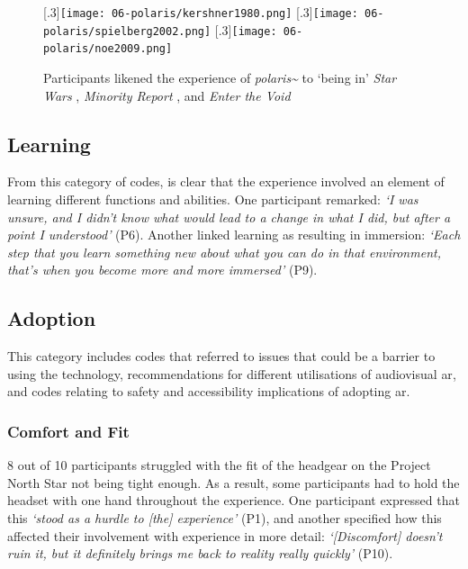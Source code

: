 \begin{figure}
    \centering
    \captionsetup{justification=centering, margin=1.5cm}
    [.3\linewidth]{\texttt{[image: 06-polaris/kershner1980.png]}}
    \hfill
    [.3\linewidth]{\texttt{[image: 06-polaris/spielberg2002.png]}}
    \hfill
    [.3\linewidth]{\texttt{[image: 06-polaris/noe2009.png]}}
    \caption{Participants likened the experience of \textit{polaris\textasciitilde{}} to `being in' \textit{Star Wars} , \textit{Minority Report} , and \textit{Enter the Void} }\label{fig: films}
\end{figure}

\subsection{Learning}\label{sec: polaris-feedback-learning}
From this category of codes, is clear that the experience involved an element of learning different functions and abilities. One participant remarked: \textit{`I was unsure, and I didn't know what would lead to a change in what I did, but after a point I understood'} (P6). Another linked learning as resulting in immersion: \textit{`Each step that you learn something new about what you can do in that environment, that's when you become more and more immersed'} (P9).

\subsection{Adoption}\label{sec: polaris-feedback-adoption}
This category includes codes that referred to issues that could be a barrier to using the technology, recommendations for different utilisations of audiovisual \ac{ar}, and codes relating to safety and accessibility implications of adopting \ac{ar}.

\subsubsection{Comfort and Fit}\label{sec: polaris-feedback-adoption-comfort}
8 out of 10 participants struggled with the fit of the headgear on the Project North Star not being tight enough. As a result, some participants had to hold the headset with one hand throughout the experience. One participant expressed that this \textit{`stood as a hurdle to [the] experience'} (P1), and another specified how this affected their involvement with experience in more detail: \textit{`[Discomfort] doesn't ruin it, but it definitely brings me back to reality really quickly'} (P10).
